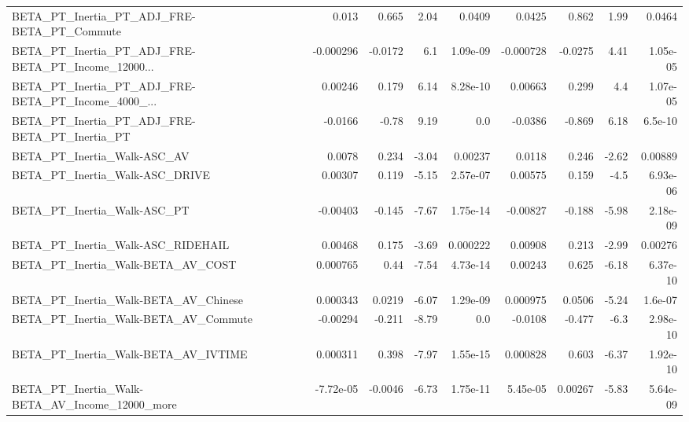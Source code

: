 \begin{tabular}{lrrrrrrrr}
BETA\_PT\_Inertia\_PT\_ADJ\_FRE-BETA\_PT\_Commute         &       0.013 &        0.665 &     2.04 &   0.0409 &     0.0425 &       0.862 &         1.99 &        0.0464 \\
BETA\_PT\_Inertia\_PT\_ADJ\_FRE-BETA\_PT\_Income\_12000... &   -0.000296 &      -0.0172 &      6.1 & 1.09e-09 &  -0.000728 &     -0.0275 &         4.41 &      1.05e-05 \\
BETA\_PT\_Inertia\_PT\_ADJ\_FRE-BETA\_PT\_Income\_4000\_... &     0.00246 &        0.179 &     6.14 & 8.28e-10 &    0.00663 &       0.299 &          4.4 &      1.07e-05 \\
BETA\_PT\_Inertia\_PT\_ADJ\_FRE-BETA\_PT\_Inertia\_PT      &     -0.0166 &        -0.78 &     9.19 &      0.0 &    -0.0386 &      -0.869 &         6.18 &       6.5e-10 \\
BETA\_PT\_Inertia\_Walk-ASC\_AV                        &      0.0078 &        0.234 &    -3.04 &  0.00237 &     0.0118 &       0.246 &        -2.62 &       0.00889 \\
BETA\_PT\_Inertia\_Walk-ASC\_DRIVE                     &     0.00307 &        0.119 &    -5.15 & 2.57e-07 &    0.00575 &       0.159 &         -4.5 &      6.93e-06 \\
BETA\_PT\_Inertia\_Walk-ASC\_PT                        &    -0.00403 &       -0.145 &    -7.67 & 1.75e-14 &   -0.00827 &      -0.188 &        -5.98 &      2.18e-09 \\
BETA\_PT\_Inertia\_Walk-ASC\_RIDEHAIL                  &     0.00468 &        0.175 &    -3.69 & 0.000222 &    0.00908 &       0.213 &        -2.99 &       0.00276 \\
BETA\_PT\_Inertia\_Walk-BETA\_AV\_COST                  &    0.000765 &         0.44 &    -7.54 & 4.73e-14 &    0.00243 &       0.625 &        -6.18 &      6.37e-10 \\
BETA\_PT\_Inertia\_Walk-BETA\_AV\_Chinese               &    0.000343 &       0.0219 &    -6.07 & 1.29e-09 &   0.000975 &      0.0506 &        -5.24 &       1.6e-07 \\
BETA\_PT\_Inertia\_Walk-BETA\_AV\_Commute               &    -0.00294 &       -0.211 &    -8.79 &      0.0 &    -0.0108 &      -0.477 &         -6.3 &      2.98e-10 \\
BETA\_PT\_Inertia\_Walk-BETA\_AV\_IVTIME                &    0.000311 &        0.398 &    -7.97 & 1.55e-15 &   0.000828 &       0.603 &        -6.37 &      1.92e-10 \\
BETA\_PT\_Inertia\_Walk-BETA\_AV\_Income\_12000\_more     &   -7.72e-05 &      -0.0046 &    -6.73 & 1.75e-11 &   5.45e-05 &     0.00267 &        -5.83 &      5.64e-09 \\

\end{tabular}
